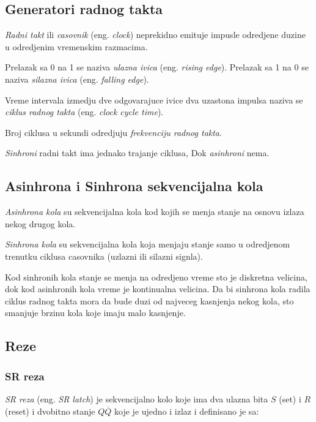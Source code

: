 \documentclass[12p,a4paper]{article}
\begin{document}
\begin{multicols}{2}
    \subsection{Generatori radnog takta}

    \emph{Radni takt} ili \emph{casovnik} (eng. \emph{clock}) neprekidno 
    emituje impusle odredjene duzine u odredjenim vremenskim razmacima. 

    Prelazak sa 0 na 1 se naziva \emph{ulazna ivica} (eng. \emph{rising edge}).
    Prelazak sa 1 na 0 se naziva \emph{silazna ivica} 
    (eng. \emph{falling edge}).

    Vreme intervala izmedju dve odgovarajuce ivice dva uzastona impulsa naziva 
    se \emph{ciklus radnog takta} (eng. \emph{clock cycle time}).

    Broj ciklusa u sekundi odredjuju \emph{frekvenciju radnog takta}.

    \emph{Sinhroni} radni takt ima jednako trajanje ciklusa, Dok 
    \emph{asinhroni} nema.

    \subsection{Asinhrona i Sinhrona sekvencijalna kola}

    \emph{Asinhrona kola} su sekvencijalna kola kod kojih se menja stanje na
    osnovu izlaza nekog drugog kola.

    \emph{Sinhrona kola} su sekvencijalna kola koja menjaju stanje samo u 
    odredjenom trenutku ciklusa casovnika (uzlazni ili silazni signla).

    Kod sinhronih kola stanje se menja na odredjeno vreme sto je diskretna
    velicina, dok kod asinhronih kola vreme je kontinualna velicina.
    Da bi sinhrona kola radila ciklus radnog takta mora da bude duzi od 
    najveceg kasnjenja nekog kola, sto smanjuje brzinu kola koje imaju malo
    kasnjenje.

    \subsection{Reze}

    \subsubsection{SR reza}

    \emph{SR reza} (eng. \emph{SR latch}) je sekvencijalno kolo koje ima dva
    ulazna bita $S$ (set) i $R$ (reset) i dvobitno stanje $Q\overline{Q}$ koje 
    je ujedno i izlaz i definisano je sa:


\end{multicols}
\end{document}
